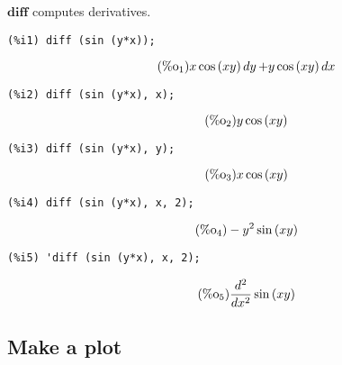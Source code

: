 \documentclass[12pt,leqno]{article}
\begin{document}
$\mathbf{diff}$ computes derivatives.
\begin{verbatim}
(%i1) diff (sin (y*x));
\end{verbatim}
\begin{equation}
\tag{$\mathop{\mathrm{\%o}_{1}}$}x \cos \left(x y\right) \mathop{dy}+y \cos \left(x y\right) \mathop{dx}
\label{eq:doc-group1-code30-1-1}
\end{equation}
\begin{verbatim}
(%i2) diff (sin (y*x), x);
\end{verbatim}
\begin{equation}
\tag{$\mathop{\mathrm{\%o}_{2}}$}y \cos \left(x y\right)
\label{eq:doc-group1-code30-2-1}
\end{equation}
\begin{verbatim}
(%i3) diff (sin (y*x), y);
\end{verbatim}
\begin{equation}
\tag{$\mathop{\mathrm{\%o}_{3}}$}x \cos \left(x y\right)
\label{eq:doc-group1-code30-3-1}
\end{equation}
\begin{verbatim}
(%i4) diff (sin (y*x), x, 2);
\end{verbatim}
\begin{equation}
\tag{$\mathop{\mathrm{\%o}_{4}}$}-{y}^{2} \sin \left(x y\right)
\label{eq:doc-group1-code30-4-1}
\end{equation}
\begin{verbatim}
(%i5) 'diff (sin (y*x), x, 2);
\end{verbatim}
\begin{equation}
\tag{$\mathop{\mathrm{\%o}_{5}}$}\frac{{d}^{2}}{d {x}^{2}}\sin \left(x y\right)
\label{eq:doc-group1-code30-5-1}
\end{equation}


\subsection{Make a plot}
\end{document}
